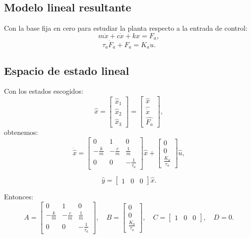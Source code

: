 \documentclass[11pt]{article}
\begin{document}
\subsection{Modelo lineal resultante}

Con la base fija en cero para estudiar la planta respecto a la entrada de control:
\begin{equation}
m\ddot{x} + c\dot{x} + kx = F_a,
\label{eq:lineal_mecanico}
\end{equation}
\begin{equation}
\tau_a\dot{F}_a + F_a = K_a u.
\label{eq:lineal_act}
\end{equation}

\subsection{Espacio de estado lineal}

Con los estados escogidos:
\[
\hat{x}=
\begin{bmatrix}
\hat{x}_1\\
\hat{x}_2\\
\hat{x}_3
\end{bmatrix}

=
\begin{bmatrix}
\hat{x}\\
\widehat{\dot{x}}\\
\widehat{F_a}
\end{bmatrix},
\]
obtenemos:
\begin{equation}
\dot{\hat{x}}=
\begin{bmatrix}
0 & 1 & 0\\
-\frac{k}{m} & -\frac{c}{m} & \frac{1}{m}\\
0 & 0 & -\frac{1}{\tau_a}
\end{bmatrix}
\hat{x}

+
\begin{bmatrix}
0\\
0\\
\frac{K_a}{\tau_a}
\end{bmatrix}
\hat{u},
\end{equation}

\begin{equation}
\hat{y}=
\begin{bmatrix}
1 & 0 & 0
\end{bmatrix}
\hat{x}.
\end{equation}

Entonces:
\[
A=
\begin{bmatrix}
0 & 1 & 0\\
-\frac{k}{m} & -\frac{c}{m} & \frac{1}{m}\\
0 & 0 & -\frac{1}{\tau_a}
\end{bmatrix},
\quad
B=
\begin{bmatrix}
0\\
0\\
\frac{K_a}{\tau_a}
\end{bmatrix},
\quad
C=
\begin{bmatrix}
1 & 0 & 0
\end{bmatrix},
\quad
D=0.
\]
\end{document}
